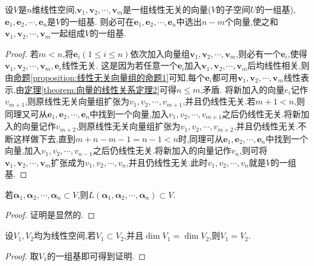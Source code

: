 \documentclass[lang=cn,newtx,10pt,scheme=chinese]{elegantbook}
\begin{document}
\begin{theorem}[基扩充定理]\label{theorem:基扩充定理}
设\(V\)是\(n\)维线性空间,\(\boldsymbol{v}_1,\boldsymbol{v}_2,\cdots,\boldsymbol{v}_m\)是一组线性无关的向量(\(V\)的子空间\(U\)的一组基),\(\boldsymbol{e}_1,\boldsymbol{e}_2,\cdots,\boldsymbol{e}_n\)是\(V\)的一组基. 则必可在\(\boldsymbol{e}_1,\boldsymbol{e}_2,\cdots,\boldsymbol{e}_n\)中选出\(n - m\)个向量,使之和\(\boldsymbol{v}_1,\boldsymbol{v}_2,\cdots,\boldsymbol{v}_m\)一起组成\(V\)的一组基.
\end{theorem}
\begin{proof}
若\(m< n\),将\(\boldsymbol{e}_i(1\leq i\leq n)\)依次加入向量组\(\boldsymbol{v}_1,\boldsymbol{v}_2,\cdots,\boldsymbol{v}_m\),则必有一个\(\boldsymbol{e}_i\),使得\(\boldsymbol{v}_1,\boldsymbol{v}_2,\cdots,\boldsymbol{v}_m,\boldsymbol{e}_i\)线性无关. 这是因为若任意一个\(\boldsymbol{e}_i\)加入\(\boldsymbol{v}_1,\boldsymbol{v}_2,\cdots,\boldsymbol{v}_m\)后均线性相关,则由\hyperref[proposition:线性无关向量组的命题1]{命题\ref{proposition:线性无关向量组的命题1}}可知,每个\(\boldsymbol{e}_i\)都可用\(\boldsymbol{v}_1,\boldsymbol{v}_2,\cdots,\boldsymbol{v}_m\)线性表示,由\hyperref[theorem:向量的线性关系定理2]{定理\ref{theorem:向量的线性关系定理2}}可得\(n\leq m\),矛盾. 将新加入的向量$e_i$记作$v_{m+1}$,则原线性无关向量组扩张为$v_1,v_2,\cdots,v_{m+1}$,并且仍线性无关.若\(m + 1< n\),则同理又可从\(\boldsymbol{e}_1,\boldsymbol{e}_2,\cdots,\boldsymbol{e}_n\)中找到一个向量,加入$v_1,v_2,\cdots,v_{m+1}$之后仍线性无关.将新加入的向量记作$v_{m+2}$,则原线性无关向量组扩张为$v_1,v_2,\cdots,v_{m+2}$,并且仍线性无关.不断这样做下去,直到$m+n-m-1=n-1<n$时,同理可从\(\boldsymbol{e}_1,\boldsymbol{e}_2,\cdots,\boldsymbol{e}_n\)中找到一个向量,加入$v_1,v_2,\cdots,v_{n-1}$之后仍线性无关.将新加入的向量记作$v_{n}$,则可将\(\boldsymbol{v}_1,\boldsymbol{v}_2,\cdots,\boldsymbol{v}_m\)扩张成为$v_1,v_2,\cdots,v_{n}$,并且仍线性无关.此时$v_1,v_2,\cdots,v_{n}$就是\(V\)的一组基.
\end{proof}

\begin{proposition}\label{proposition:包含所有向量的空间也包含这些向量张成的空间}
若$\boldsymbol{\alpha }_1,\boldsymbol{\alpha }_2,\cdots ,\boldsymbol{\alpha }_n\subset V$,则$L\left( \boldsymbol{\alpha }_1,\boldsymbol{\alpha }_2,\cdots ,\boldsymbol{\alpha }_n \right) \subset V$.
\end{proposition}
\begin{proof}
证明是显然的.
\end{proof}

\begin{proposition}\label{proposition:与全空间维数相同的子空间等于全空间}
设\(V_1,V_2\)均为线性空间,若\(V_1\subset V_2\),并且\(\dim V_1 = \dim V_2\),则\(V_1 = V_2\).
\end{proposition}
\begin{proof}
取$V_1$的一组基即可得到证明.
\end{proof}
\end{document}
